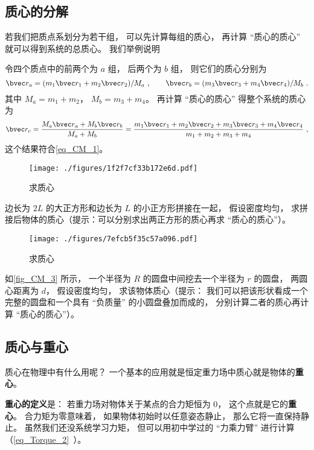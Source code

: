 \subsection{质心的分解}\label{sub_CM_1}
若我们把质点系划分为若干组， 可以先计算每组的质心， 再计算 “质心的质心” 就可以得到系统的总质心。 我们举例说明
\begin{example}{}
令四个质点中的前两个为 $a$ 组， 后两个为 $b$ 组， 则它们的质心分别为
\begin{equation}
\bvec r_a = (m_1 \bvec r_1 + m_2 \bvec r_2)/M_a~,
\qquad
\bvec r_b = (m_3 \bvec r_3 + m_4 \bvec r_4)/M_b~.
\end{equation}
其中 $M_a = m_1 + m_2$， $M_b = m_3 + m_4$。 再计算 “质心的质心” 得整个系统的质心为
\begin{equation}
\bvec r_c = \frac{M_a \bvec r_a + M_b \bvec r_b}{M_a + M_b} = \frac{m_1 \bvec r_1 + m_2 \bvec r_2 + m_3 \bvec r_3 + m_4 \bvec r_4}{m_1 + m_2 + m_3 + m_4}~,
\end{equation}
这个结果符合\autoref{eq_CM_1}。
\end{example}

\begin{exercise}{}
\begin{figure}[ht]
\centering
\texttt{[image: ./figures/1f2f7cf33b172e6d.pdf]}
\caption{求质心} \label{fig_CM_2}
\end{figure}
边长为 $2L$ 的大正方形和边长为 $L$ 的小正方形拼接在一起， 假设密度均匀， 求拼接后物体的质心（提示：可以分别求出两正方形的质心再求 “质心的质心”）。
\end{exercise}

\begin{exercise}{}
\begin{figure}[ht]
\centering
\texttt{[image: ./figures/7efcb5f35c57a096.pdf]}
\caption{求质心} \label{fig_CM_3}
\end{figure}
如\autoref{fig_CM_3} 所示， 一个半径为 $R$ 的圆盘中间挖去一个半径为 $r$ 的圆盘， 两圆心距离为 $d$， 假设密度均匀， 求该物体质心（提示： 我们可以把该形状看成一个完整的圆盘和一个具有 “负质量” 的小圆盘叠加而成的， 分别计算二者的质心再计算 “质心的质心”）。
\end{exercise}

\subsection{质心与重心}
质心在物理中有什么用呢？ 一个基本的应用就是恒定重力场中质心就是物体的\textbf{重心}。

\textbf{重心的定义}是： 若重力场对物体关于某点的合力矩恒为 0， 这个点就是它的\textbf{重心}。 合力矩为零意味着， 如果物体初始时以任意姿态静止， 那么它将一直保持静止。 虽然我们还没系统学习力矩， 但可以用初中学过的 “力乘力臂” 进行计算（\autoref{eq_Torque_2}~）。

